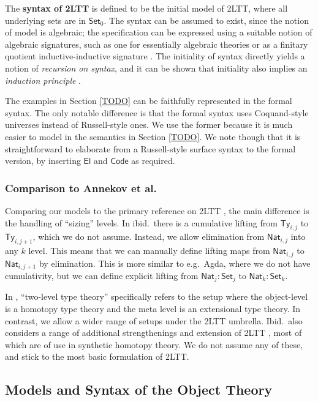 \documentclass[acmsmall]{acmart}
\newcommand{\msf}[1]{\mathsf{#1}}
\newcommand{\Code}{\msf{Code}}
\newcommand{\El}{\msf{El}}
\newcommand{\Ty}{\msf{Ty}}
\newcommand{\Nat}{\msf{Nat}}
\newcommand{\Set}{\mathsf{Set}}
\theoremstyle{remark}
\begin{document}
\begin{definition}
The \textbf{syntax of 2LTT} is defined to be the initial model of 2LTT, where
all underlying sets are in $\Set_0$. The syntax can be assumed to exist, since
the notion of model is algebraic; the specification can be expressed using a
suitable notion of algebraic signatures, such as one for essentially algebraic
theories \cite{TODO} or as a finitary quotient inductive-inductive signature
\cite{TODO}. The initiality of syntax directly yields a notion of
\emph{recursion on syntax}, and it can be shown that initiality also implies an
\emph{induction principle} \cite{TODO}.
\end{definition}

The examples in Section \ref{TODO} can be faithfully represented in the formal
syntax. The only notable difference is that the formal syntax uses Coquand-style
universes instead of Russell-style ones. We use the former because it is much
easier to model in the semantics in Section \ref{TODO}. We note though that it
is straightforward to elaborate from a Russell-style surface syntax to the
formal version, by inserting $\El$ and $\Code$ as required.

\subsubsection{Comparison to Annekov et al.}
Comparing our models to the primary reference on 2LTT \cite{twolevel}, the main
difference is the handling of ``sizing'' levels. In ibid.\ there is a cumulative
lifting from $\Ty_{i,j}$ to $\Ty_{i,j+1}$, which we do not assume. Instead,
we allow elimination from $\Nat_{i,j}$ into any $k$ level. This means that we
can manually define lifting maps from $\Nat_{i,j}$ to $\Nat_{i,j+1}$ by
elimination. This is more similar to e.g.\ Agda, where we do not have cumulativity,
but we can define explicit lifting from $\Nat_j : \Set_j$ to $\Nat_k : \Set_k$.

In \cite{twolevel}, ``two-level type theory'' specifically refers to the setup
where the object-level is a homotopy type theory and the meta level is an
extensional type theory. In contrast, we allow a wider range of setups under the
2LTT umbrella. Ibid.\ also considers a range of additional
strengthenings and extension of 2LTT \cite[Section~2.4]{twolevel}, most of which
are of use in synthetic homotopy theory. We do not assume any of these, and
stick to the most basic formulation of 2LTT.

\subsection{Models and Syntax of the Object Theory}
\end{document}
